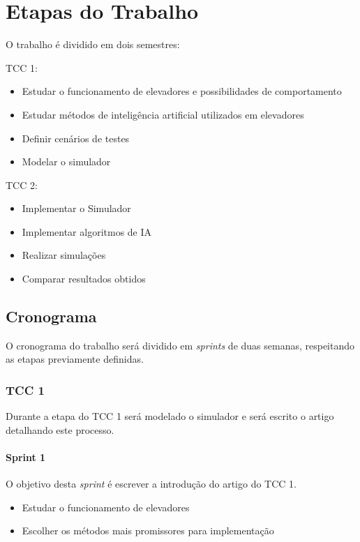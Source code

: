 \chapter{\label{chap:stages}Etapas do Trabalho}

O trabalho é dividido em dois semestres:

TCC 1:
\begin{itemize}
    \item Estudar o funcionamento de elevadores e possibilidades de
          comportamento
    \item Estudar métodos de inteligência artificial utilizados em elevadores
    \item Definir cenários de testes
    \item Modelar o simulador
\end{itemize}

TCC 2:
\begin{itemize}
    \item Implementar o Simulador
    \item Implementar algoritmos de IA
    \item Realizar simulações
    \item Comparar resultados obtidos
\end{itemize}

\section{Cronograma}

O cronograma do trabalho será dividido em \textit{sprints} de duas semanas,
respeitando as etapas previamente definidas.

\subsection{TCC 1}
Durante a etapa do TCC 1 será modelado o simulador e será escrito o artigo
detalhando este processo.

\subsubsection{Sprint 1}
O objetivo desta \textit{sprint} é escrever a introdução do artigo do TCC 1.
\begin{itemize}
    \item Estudar o funcionamento de elevadores
    \item Escolher os métodos mais promissores para implementação
\end{itemize}

